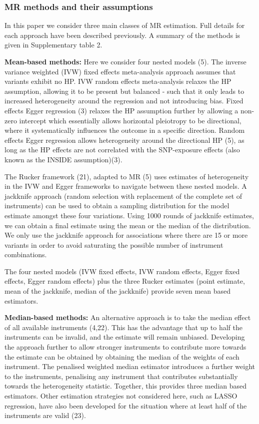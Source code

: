 \documentclass[]{article}
\begin{document}
\subsubsection{MR methods and their
assumptions}\label{mr-methods-and-their-assumptions}

In this paper we consider three main classes of MR estimation. Full
details for each approach have been described previously. A summary of
the methods is given in Supplementary table 2.

\textbf{Mean-based methods:} Here we consider four nested models (5).
The inverse variance weighted (IVW) fixed effects meta-analysis approach
assumes that variants exhibit no HP. IVW random effects meta-analysis
relaxes the HP assumption, allowing it to be present but balanced - such
that it only leads to increased heterogeneity around the regression and
not introducing bias. Fixed effects Egger regression (3) relaxes the HP
assumption further by allowing a non-zero intercept which essentially
allows horizontal pleiotropy to be directional, where it systematically
influences the outcome in a specific direction. Random effects Egger
regression allows heterogeneity around the directional HP (5), as long
as the HP effects are not correlated with the SNP-exposure effects (also
known as the INSIDE assumption)(3).

The Rucker framework (21), adapted to MR (5) uses estimates of
heterogeneity in the IVW and Egger frameworks to navigate between these
nested models. A jackknife approach (random selection with replacement
of the complete set of instruments) can be used to obtain a sampling
distribution for the model estimate amongst these four variations. Using
1000 rounds of jackknife estimates, we can obtain a final estimate using
the mean or the median of the distribution. We only use the jackknife
approach for associations where there are 15 or more variants in order
to avoid saturating the possible number of instrument combinations.

The four nested models (IVW fixed effects, IVW random effects, Egger
fixed effects, Egger random effects) plus the three Rucker estimates
(point estimate, mean of the jackknife, median of the jackknife) provide
seven mean based estimators.

\textbf{Median-based methods:} An alternative approach is to take the
median effect of all available instruments (4,22). This has the
advantage that up to half the instruments can be invalid, and the
estimate will remain unbiased. Developing the approach further to allow
stronger instruments to contribute more towards the estimate can be
obtained by obtaining the median of the weights of each instrument. The
penalised weighted median estimator introduces a further weight to the
instruments, penalising any instrument that contributes substantially
towards the heterogeneity statistic. Together, this provides three
median based estimators. Other estimation strategies not considered
here, such as LASSO regression, have also been developed for the
situation where at least half of the instruments are valid (23).
\end{document}
